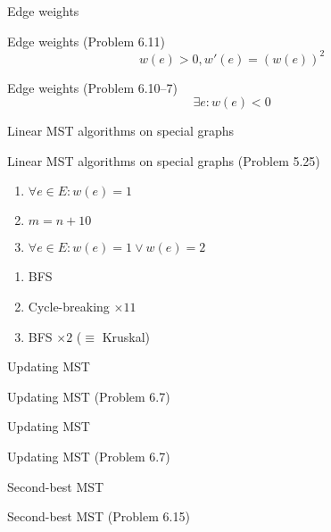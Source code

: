 \begin{frame}{Edge weights}
  \begin{exampleblock}{Edge weights (Problem 6.11)}
	\[
	  w(e) > 0, w'(e) = \left(w(e)\right)^2
	\]
  \end{exampleblock}

  \vspace{0.50cm}
  \begin{exampleblock}{Edge weights (Problem 6.10--7)}
	\[
	  \exists e: w(e) < 0
	\]
  \end{exampleblock}
\end{frame}
\begin{frame}{Linear MST algorithms on special graphs}
  \begin{exampleblock}{Linear MST algorithms on special graphs (Problem 5.25)}
	\begin{enumerate}
	  \item $\forall e \in E: w(e) = 1$
	  \item $m = n + 10$
	  \item $\forall e \in E: w(e) = 1 \lor w(e) = 2$
	\end{enumerate}
  \end{exampleblock}

  \begin{enumerate}
	\item BFS
	\item Cycle-breaking $\times 11$
	\item BFS $\times 2$ ($\equiv$ Kruskal)
  \end{enumerate}
\end{frame}
\begin{frame}{Updating MST}
  \begin{exampleblock}{Updating MST (Problem 6.7)}
  \end{exampleblock}
\end{frame}
\begin{frame}{Updating MST}
  \begin{exampleblock}{Updating MST (Problem 6.7)}
  \end{exampleblock}
\end{frame}
\begin{frame}{Second-best MST}
  \begin{exampleblock}{Second-best MST (Problem 6.15)}
  \end{exampleblock}
\end{frame}
